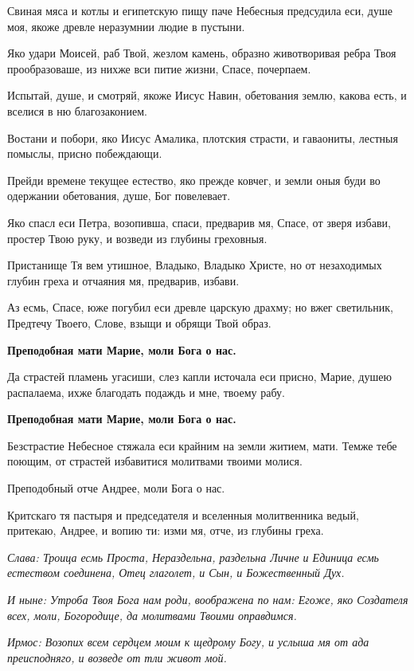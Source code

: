 Свиная мяса и котлы и египетскую пищу паче Небесныя предсудила еси, душе моя, якоже древле неразумнии людие в пустыни.


Яко удари Моисей, раб Твой, жезлом камень, образно животворивая ребра Твоя прообразоваше, из нихже вси питие жизни, Спасе, почерпаем.


Испытай, душе, и смотряй, якоже Иисус Навин, обетования землю, какова есть, и вселися в ню благозаконием.


Востани и побори, яко Иисус Амалика, плотския страсти, и гаваониты, лестныя помыслы, присно побеждающи.


Прейди времене текущее естество, яко прежде ковчег, и земли оныя буди во одержании обетования, душе, Бог повелевает.


Яко спасл еси Петра, возопивша, спаси, предварив мя, Спасе, от зверя избави, простер Твою руку, и возведи из глубины греховныя.


Пристанище Тя вем утишное, Владыко, Владыко Христе, но от незаходимых глубин греха и отчаяния мя, предварив, избави.


Аз есмь, Спасе, юже погубил еси древле царскую драхму; но вжег светильник, Предтечу Твоего, Слове, взыщи и обрящи Твой образ.


\bfseries Преподобная мати Марие, моли Бога о нас.\normalfont{}


Да страстей пламень угасиши, слез капли источала еси присно, Марие, душею распалаема, ихже благодать подаждь и мне, твоему рабу.


\bfseries Преподобная мати Марие, моли Бога о нас.\normalfont{}


Безстрастие Небесное стяжала еси крайним на земли житием, мати. Темже тебе поющим, от страстей избавитися молитвами твоими молися.


Преподобный отче Андрее, моли Бога о нас.


Критскаго тя пастыря и председателя и вселенныя молитвенника ведый, притекаю, Андрее, и вопию ти: изми мя, отче, из глубины греха.


\itshape Слава\normalfont{}: Троица есмь Проста, Нераздельна, раздельна Личне и Единица есмь естеством соединена, Отец глаголет, и Сын, и Божественный Дух.


\itshape И ныне\normalfont{}: Утроба Твоя Бога нам роди, воображена по нам: Егоже, яко Создателя всех, моли, Богородице, да молитвами Твоими оправдимся.


\itshape Ирмос\normalfont{}: Возопих всем сердцем моим к щедрому Богу, и услыша мя от ада преисподняго, и возведе от тли живот мой. 

